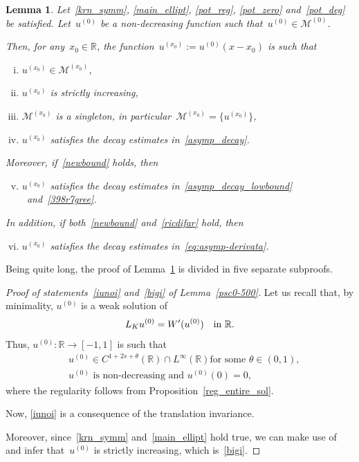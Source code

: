 \documentclass[10pt,a4paper]{amsart}
\newtheorem{lemma}[theorem]{Lemma}
\numberwithin{equation}{section}
\newcommand{\R}{\mathbb{R}}
\begin{document}
\begin{lemma}\label{psc0-500}
Let~\eqref{krn_symm}, \eqref{main_ellipt}, \eqref{pot_reg}, \eqref{pot_zero} and~\eqref{pot_deg} be satisfied. Let~$u^{(0)}$ be a non-decreasing function such that~$u^{(0)} \in \mathscr{M}^{(0)}$. 

Then, for any~$x_0 \in \R$, the function~$u^{(x_0)}:= u^{(0)}(x-x_0)$ is such that
\begin{enumerate}[(i)]
\item $u^{(x_0)} \in \mathscr{M}^{(x_0)}$, \label{iunoi}
\item $u^{(x_0)}$ is strictly increasing, \label{bigi}
\item $\mathscr{M}^{(x_0)}$ is a singleton, in particular~$\mathscr{M}^{(x_0)}= \{ u^{(x_0)}\}$, \label{iiunoii}
\item $u^{(x_0)}$ satisfies the decay estimates in~\eqref{asymp_decay}. \label{9bbf0}
\end{enumerate}

Moreover, if~\eqref{newbound} holds, then
\begin{enumerate}[(i)]
\setcounter{enumi}{4}
\item $u^{(x_0)}$  satisfies the decay estimates in~\eqref{asymp_decay_lowbound} \ \mbox{and~\eqref{398r7gree}}. \label{9873grv}
\end{enumerate}

In addition, if both~\eqref{newbound} and~\eqref{ricdifar} hold, then
\begin{enumerate}[(i)]
\setcounter{enumi}{5}
\item $u^{(x_0)}$  satisfies the decay estimates in~\eqref{eq:asymp-derivata}.\label{iiiiunoiiii}
\end{enumerate}
\end{lemma}

Being quite long, the proof of Lemma~\ref{psc0-500} is divided in five separate subproofs.

\begin{proof}[Proof of statements~\eqref{iunoi} and~\eqref{bigi} of Lemma~\eqref{psc0-500}]
Let us recall that, by minimality, $u^{(0)}$ is a weak solution of 
\begin{equation}\label{miser45}
{L}_K u^{(0)} = W\rq{}(u^{(0)}) \quad\mbox{in } \R.
\end{equation}
Thus, $u^{(0)}: \R \to [-1,1]$ is such that
\begin{equation}\label{propert45}\begin{split}&
{\mbox{$u^{(0)}\in C^{1+2s+\theta}(\R)\cap L^{\infty}(\R)$
for some~$\theta\in(0,1)$,}}\\&{\mbox{$u^{(0)}$ is non-decreasing and~$u^{(0)}(0)=0$,}}\end{split}
\end{equation}
where the regularity follows from Proposition~\ref{reg_entire_sol}. 

Now, \eqref{iunoi} is a consequence of the translation invariance.

Moreover, since~\eqref{krn_symm} and~\eqref{main_ellipt} hold true, we can make use of~\cite[Lemma~4.6]{CP16} and infer that~$u^{(0)}$ is strictly increasing, which is~\eqref{bigi}.
\end{proof}
\end{document}
